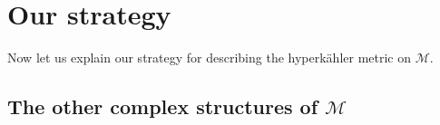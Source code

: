 \documentclass[12pt,letterpaper,reqno]{article}
\numberwithin{equation}{section}
\newcommand{\cB}{\ensuremath{\mathcal B}}
\newcommand{\cM}{\ensuremath{\mathcal M}}
\newcommand{\cO}{\ensuremath{\mathcal O}}
\newcommand{\half}{\ensuremath{\frac{1}{2}}}
\newcommand{\kahler}{K\"ahler\xspace}
\newcommand{\hk}{hyperk\"ahler\xspace}
\newcommand{\I}{{\mathrm i}}
\newcommand{\de}{\mathrm{d}}
\renewcommand{\sf}{\mathrm{sf}}
\DeclareMathOperator{\im}{Im}
\DeclareMathOperator{\Hom}{Hom}
\newcommand{\SU}{\mathrm{SU}}
\newcommand{\U}{\mathrm{U}}
\newcommand{\fixme}[1]{{\color{orange}{[#1]}}}
\begin{document}
\fixme{formulate the weak form of conjecture}








\section{Our strategy}

Now let us explain our strategy for describing the \hk metric on $\cM$.

\subsection{The other complex structures of \texorpdfstring{$\cM$}{M}}
\end{document}
